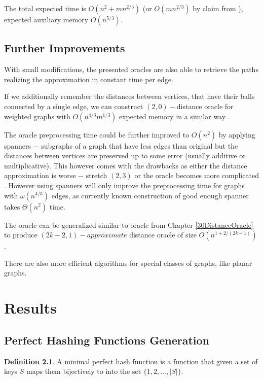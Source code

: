 \documentclass[shortabstract, lic, english]{iithesis}
\theoremstyle{definition} \newtheorem{definition}{Definition}[chapter]
\theoremstyle{plain} \newtheorem{remark}[definition]{Observation}
\theoremstyle{plain} \newtheorem{theorem}[definition]{Theorem}
\theoremstyle{plain} \newtheorem{lemma}[definition]{Lemma}
\theoremstyle{plain} \newtheorem{conjecture}[definition]{Conjecture}
\begin{document}
The total expected time is $O(n^{2} + mn^{2/3})$ (or $O(mn^{2/3})$ by claim from \cite{21OracleSpannerNoPenaltyNoLog}), expected auxiliary memory $O(n^{5/3})$.

\section{Further Improvements}

With small modifications, the presented oracles are also able to retrieve the paths realizing the approximation in constant time per edge.

If we additionally remember the distances between vertices, that have their balls connected by a single edge, we can construct $(2,0)-$distance oracle for weighted graphs with $O(n^{4/3}m^{1/3})$ expected memory in a similar way \cite{21OracleLessMemory}.

The oracle preprocessing time could be further improved to $O(n^2)$ by applying spanners $-$ subgraphs of a graph that have less edges than original
but the distances between vertices are preserved up to some error (usually additive or multiplicative).
This however comes with the drawbacks as either the distance approximation is worse $-$ stretch $(2,3)$ \cite{21OracleBasic} or the oracle becomes more complicated \cite{21OracleSpannerNoPenalty, 21OracleSpannerNoPenaltyNoLog}.
However using spanners will only improve the preprocessing time for graphs with $\omega(n^{4/3})$ edges, as currently known construction of good enough spanner takes $\Theta(n^2)$ time.

The oracle can be generalized similar to oracle from Chapter \ref{30DistanceOracle} to produce $(2k - 2, 1)-approximate$ distance oracle of size $O(n^{1 + 2/(2k-1)})$ \cite{a1Oracle}.

There are also more efficient algorithms for special classes of graphs, like planar graphs.


\chapter{Results} \label{21PracticalComparison}

\section{Perfect Hashing Functions Generation}

\begin{definition}
    A minimal perfect hash function is a function that given a set of keys $S$ maps them bijectively to into the set $\{1,2,\ldots,|S|\}$.
\end{definition}
\end{document}
